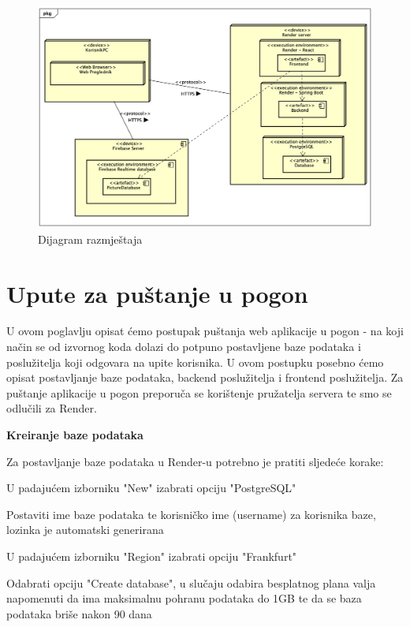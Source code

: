			 \begin{figure}[H]
			 	\includegraphics[scale=0.45]{dijagrami/dijagramRazmjestaja.png}
			 	\centering
			 	\caption{Dijagram razmještaja}
			 	\label{fig:promjene}
			 \end{figure}
			
			\eject 
		
		\section{Upute za puštanje u pogon}
		
			U ovom poglavlju opisat ćemo postupak puštanja web aplikacije u pogon - na koji način se od izvornog koda dolazi do potpuno postavljene baze podataka i poslužitelja koji odgovara na upite korisnika. U ovom postupku posebno ćemo opisat postavljanje baze podataka, backend poslužitelja i frontend poslužitelja. Za puštanje aplikacije u pogon preporuča se korištenje pružatelja servera te smo se odlučili za Render.
			
			\textbf{Kreiranje baze podataka}
			
			Za postavljanje baze podataka u Render-u potrebno je pratiti sljedeće korake:
			
			\begin{packed_enum}
				
				\item  U padajućem izborniku "New" izabrati opciju "PostgreSQL"
				\item	Postaviti ime baze podataka te korisničko ime (username) za korisnika baze, lozinka je automatski generirana
				\item	U padajućem izborniku "Region" izabrati opciju "Frankfurt"
				\item	Odabrati opciju "Create database", u slučaju odabira besplatnog plana valja napomenuti da ima maksimalnu pohranu podataka do 1GB te da se baza podataka briše nakon 90 dana 

			\end{packed_enum}
		
